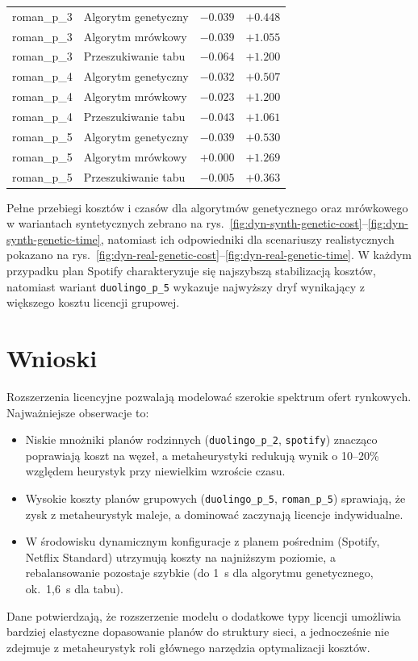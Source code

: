 \begin{table}[H]
\begin{tabular}{llrr}
    roman\_p\_3           & Algorytm genetyczny & $-0.039$                      & $+0.448$                   \\
    roman\_p\_3           & Algorytm mrówkowy   & $-0.039$                      & $+1.055$                   \\
    roman\_p\_3           & Przeszukiwanie tabu & $-0.064$                      & $+1.200$                   \\
    roman\_p\_4           & Algorytm genetyczny & $-0.032$                      & $+0.507$                   \\
    roman\_p\_4           & Algorytm mrówkowy   & $-0.023$                      & $+1.200$                   \\
    roman\_p\_4           & Przeszukiwanie tabu & $-0.043$                      & $+1.061$                   \\
    roman\_p\_5           & Algorytm genetyczny & $-0.039$                      & $+0.530$                   \\
    roman\_p\_5           & Algorytm mrówkowy   & $+0.000$                      & $+1.269$                   \\
    roman\_p\_5           & Przeszukiwanie tabu & $-0.005$                      & $+0.363$                   \\
  \end{tabular}
\end{table}

Pełne przebiegi kosztów i czasów dla algorytmów genetycznego oraz mrówkowego w wariantach syntetycznych zebrano na rys.~\ref{fig:dyn-synth-genetic-cost}--\ref{fig:dyn-synth-genetic-time}, natomiast ich odpowiedniki dla scenariuszy realistycznych pokazano na rys.~\ref{fig:dyn-real-genetic-cost}--\ref{fig:dyn-real-genetic-time}. W każdym przypadku plan Spotify charakteryzuje się najszybszą stabilizacją kosztów, natomiast wariant \texttt{duolingo\_p\_5} wykazuje najwyższy dryf wynikający z większego kosztu licencji grupowej.

\section{Wnioski}

Rozszerzenia licencyjne pozwalają modelować szerokie spektrum ofert rynkowych. Najważniejsze obserwacje to:
\begin{itemize}
  \item Niskie mnożniki planów rodzinnych (\texttt{duolingo\_p\_2}, \texttt{spotify}) znacząco poprawiają koszt na węzeł, a metaheurystyki redukują wynik o 10--20\% względem heurystyk przy niewielkim wzroście czasu.
  \item Wysokie koszty planów grupowych (\texttt{duolingo\_p\_5}, \texttt{roman\_p\_5}) sprawiają, że zysk z metaheurystyk maleje, a dominować zaczynają licencje indywidualne.
  \item W środowisku dynamicznym konfiguracje z planem pośrednim (Spotify, Netflix Standard) utrzymują koszty na najniższym poziomie, a rebalansowanie pozostaje szybkie (do 1~s dla algorytmu genetycznego, ok.~1,6~s dla tabu).
\end{itemize}

Dane potwierdzają, że rozszerzenie modelu o dodatkowe typy licencji umożliwia bardziej elastyczne dopasowanie planów do struktury sieci, a jednocześnie nie zdejmuje z metaheurystyk roli głównego narzędzia optymalizacji kosztów.

